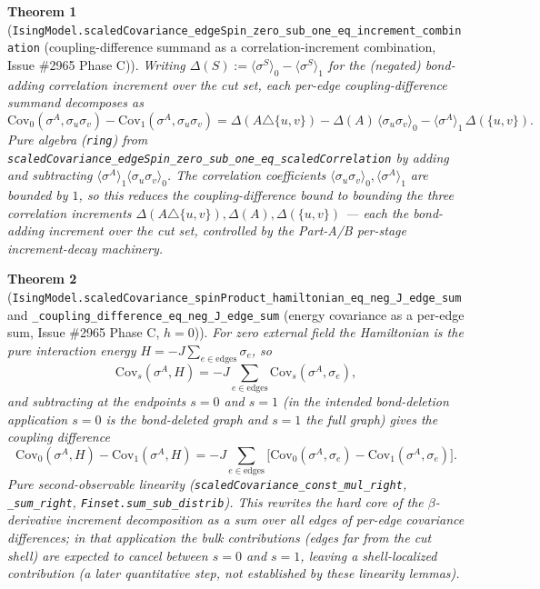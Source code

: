 \documentclass[a4paper,11pt]{article}
\newtheorem{theorem}{Theorem}
\begin{document}
\begin{theorem}[\texttt{IsingModel.scaledCovariance\_edgeSpin\_zero\_sub\_one\_eq\_increment\_combination}
(coupling-difference summand as a correlation-increment combination, Issue \#2965 Phase C)]
Writing $\Delta(S):=\langle\sigma^S\rangle_0-\langle\sigma^S\rangle_1$ for the (negated)
bond-adding correlation increment over the cut set, each per-edge coupling-difference
summand decomposes as
\[
  \mathrm{Cov}_0(\sigma^A,\sigma_u\sigma_v)-\mathrm{Cov}_1(\sigma^A,\sigma_u\sigma_v)
    = \Delta(A\triangle\{u,v\}) - \Delta(A)\,\langle\sigma_u\sigma_v\rangle_0
      - \langle\sigma^A\rangle_1\,\Delta(\{u,v\}).
\]
Pure algebra (\texttt{ring}) from
\texttt{scaledCovariance\_edgeSpin\_zero\_sub\_one\_eq\_scaledCorrelation} by adding and
subtracting $\langle\sigma^A\rangle_1\langle\sigma_u\sigma_v\rangle_0$. The correlation
coefficients $\langle\sigma_u\sigma_v\rangle_0,\langle\sigma^A\rangle_1$ are bounded by
$1$, so this reduces the coupling-difference bound to bounding the three correlation
increments $\Delta(A\triangle\{u,v\}),\Delta(A),\Delta(\{u,v\})$ — each the bond-adding
increment over the cut set, controlled by the Part-A/B per-stage increment-decay
machinery.
\end{theorem}

\begin{theorem}[\texttt{IsingModel.scaledCovariance\_spinProduct\_hamiltonian\_eq\_neg\_J\_edge\_sum}
and \texttt{\_coupling\_difference\_eq\_neg\_J\_edge\_sum} (energy covariance as a per-edge
sum, Issue \#2965 Phase C, $h=0$)]
For zero external field the Hamiltonian is the pure interaction energy
$H=-J\sum_{e\in\mathrm{edges}}\sigma_e$, so
\[
  \mathrm{Cov}_s(\sigma^A,H) = -J\sum_{e\in\mathrm{edges}}\mathrm{Cov}_s(\sigma^A,\sigma_e),
\]
and subtracting at the endpoints $s=0$ and $s=1$ (in the intended bond-deletion
application $s=0$ is the bond-deleted graph and $s=1$ the full graph) gives the
coupling difference
\[
  \mathrm{Cov}_0(\sigma^A,H)-\mathrm{Cov}_1(\sigma^A,H)
    = -J\sum_{e\in\mathrm{edges}}\bigl[\mathrm{Cov}_0(\sigma^A,\sigma_e)
        -\mathrm{Cov}_1(\sigma^A,\sigma_e)\bigr].
\]
Pure second-observable linearity (\texttt{scaledCovariance\_const\_mul\_right},
\texttt{\_sum\_right}, \texttt{Finset.sum\_sub\_distrib}). This rewrites the hard core of
the $\beta$-derivative increment decomposition as a sum over all edges of per-edge
covariance differences; in that application the bulk contributions (edges far from the
cut shell) are expected to cancel between $s=0$ and $s=1$, leaving a shell-localized
contribution (a later quantitative step, not established by these linearity lemmas).
\end{theorem}
\end{document}
